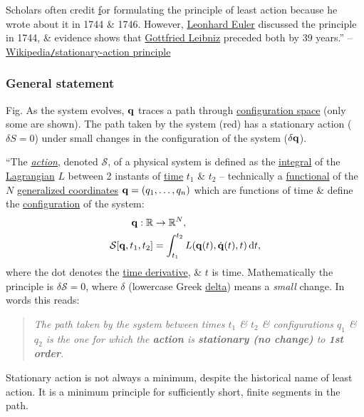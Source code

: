 \documentclass{article}
\begin{document}
Scholars often credit \href{Pierre Louis Maupertuis} for formulating the principle of least action because he wrote about it in 1744 \& 1746. However, \href{https://en.wikipedia.org/wiki/Leonhard_Euler}{Leonhard Euler} discussed the principle in 1744, \& evidence shows that \href{https://en.wikipedia.org/wiki/Gottfried_Leibniz}{Gottfried Leibniz} preceded both by 39 years.'' -- \href{https://en.wikipedia.org/wiki/Stationary-action_principle}{Wikipedia{\tt/}stationary-action principle}

\subsubsection{General statement}
\textsf{Fig. As the system evolves, ${\bf q}$ traces a path through \href{https://en.wikipedia.org/wiki/Configuration_space_(physics)}{configuration space} (only some are shown). The path taken by the system (red) has a stationary action ($\delta S = 0$) under small changes in the configuration of the system ($\delta{\bf q}$).}

``The \href{https://en.wikipedia.org/wiki/Action_(physics)}{\textit{action}}, denoted $\mathcal{S}$, of a physical system is defined as the \href{https://en.wikipedia.org/wiki/Integral_(mathematics)}{integral} of the \href{https://en.wikipedia.org/wiki/Lagrangian_mechanics}{Lagrangian} $L$ between 2 instants of \href{https://en.wikipedia.org/wiki/Time_in_physics}{time} $t_1$ \& $t_2$ -- technically a \href{https://en.wikipedia.org/wiki/Functional_(mathematics)}{functional} of the $N$ \href{https://en.wikipedia.org/wiki/Generalized_coordinates}{generalized coordinates} ${\bf q} = (q_1,\ldots,q_n)$ which are functions of time \& define the \href{https://en.wikipedia.org/wiki/Configuration_space_(physics)}{configuration} of the system:
\begin{align*}
	{\bf q}:\mathbb{R}&\to\mathbb{R}^N,\\
	\mathcal{S}[{\bf q},t_1,t_2] &= \int_{t_1}^{t_2} L({\bf q}(t),\dot{\bf q}(t),t)\,{\rm d}t,
\end{align*}
where the dot denotes the \href{https://en.wikipedia.org/wiki/Time_derivative}{time derivative}, \& $t$ is time. Mathematically the principle is $\delta\mathcal{S} = 0$, where $\delta$ (lowercase Greek \href{https://en.wikipedia.org/wiki/Delta_(letter)}{delta}) means a \textit{small} change. In words this reads:
\begin{quotation}
	\textit{The path taken by the system between times $t_1$ \& $t_2$ \& configurations $q_1$ \& $q_2$ is the one for which the \textbf{action} is \textbf{stationary (no change)} to \textbf{1st order}.}
\end{quotation}
Stationary action is not always a minimum, despite the historical name of least action. It is a minimum principle for sufficiently short, finite segments in the path.
\end{document}
